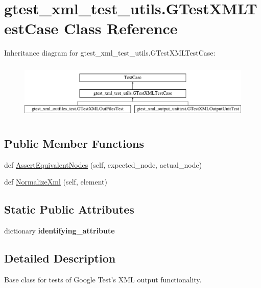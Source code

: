 \hypertarget{classgtest__xml__test__utils_1_1_g_test_x_m_l_test_case}{}\section{gtest\+\_\+xml\+\_\+test\+\_\+utils.\+G\+Test\+X\+M\+L\+Test\+Case Class Reference}
\label{classgtest__xml__test__utils_1_1_g_test_x_m_l_test_case}
Inheritance diagram for gtest\+\_\+xml\+\_\+test\+\_\+utils.\+G\+Test\+X\+M\+L\+Test\+Case\+:\begin{figure}[H]
\begin{center}
\leavevmode
\includegraphics[height=2.781457cm]{classgtest__xml__test__utils_1_1_g_test_x_m_l_test_case}
\end{center}
\end{figure}
\subsection*{Public Member Functions}
\begin{DoxyCompactItemize}
\item 
def \mbox{\hyperlink{classgtest__xml__test__utils_1_1_g_test_x_m_l_test_case_a977273e8863f4f41d121bb5a64b08d32}{Assert\+Equivalent\+Nodes}} (self, expected\+\_\+node, actual\+\_\+node)
\item 
def \mbox{\hyperlink{classgtest__xml__test__utils_1_1_g_test_x_m_l_test_case_ac4823e96c3b5327b25a340a3605447d9}{Normalize\+Xml}} (self, element)
\end{DoxyCompactItemize}
\subsection*{Static Public Attributes}
\begin{DoxyCompactItemize}
\item 
dictionary {\bfseries identifying\+\_\+attribute}
\end{DoxyCompactItemize}


\subsection{Detailed Description}
\begin{DoxyVerb}Base class for tests of Google Test's XML output functionality.
\end{DoxyVerb}
 

